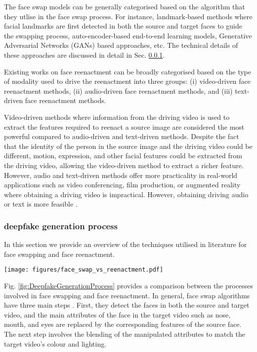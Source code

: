 The face swap models can be generally categorised based on the algorithm that they utlise in the face swap process. For instance, landmark-based methods where facial landmarks are first detected in both the source and target faces to guide the swapping process, auto-encoder-based end-to-end learning models, Generative Adversarial Networks (GANs) based approaches, etc. The technical details of these approaches are discussed in detail in Sec. \ref{sec:DeepfakeGenerationProcess}.

Existing works on face reenactment can be broadly categorised based on the type of modality used to drive the reenactment into three groups: (i) video-driven face reenactment methods, (ii) audio-driven face reenactment methods, and (iii) text-driven face reenactment methods. 

Video-driven methods where information from the driving video is used to extract the features required to reenact a source image are considered the most powerful compared to audio-driven and text-driven methods. Despite the fact that the identity of the person in the source image and the driving video could be different, motion, expression, and other facial features could be extracted from the driving video, allowing the video-driven method to extract a richer feature. However, audio and text-driven methods offer more practicality in real-world applications such as video conferencing, film production, or augmented reality where obtaining a driving video is impractical. However, obtaining driving audio or text is more feasible \cite{agarwal2023audio}.


\subsubsection{deepfake generation process}\label{sec:DeepfakeGenerationProcess}
In this section we provide an overview of the techniques utilised in literature for face swapping and face reenactment.

\begin{figure*}
    \centering
    \texttt{[image: figures/face\_swap\_vs\_reenactment.pdf]}
    \caption{A comparison between face swapping and face reenactment processes}
    \label{fig:DeepfakeGenerationProcess}
\end{figure*}

Fig. \ref{fig:DeepfakeGenerationProcess} provides a comparison between the processes involved in face swapping and face reenactment. In general, face swap algorithms have three main steps \cite{waseem2023deepfake}. First, they detect the faces in both the source and target video, and the main attributes of the face in the target video such as nose, mouth, and eyes are replaced by the corresponding features of the source face. The next step involves the blending of the manipulated attributes to match the target video's colour and lighting. 


